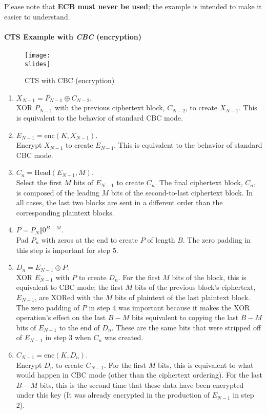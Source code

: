 Please note that \textbf{ECB must never be used}; the example is intended to make it easier to understand.

\paragraph{CTS Example with \textit{CBC} (encryption)}
\begin{figure}[H]
    \centering
    \texttt{[image: \\slides]}
    \caption{CTS with CBC (encryption)}
\end{figure}
\begin{enumerate}
    \item $X_{N-1} = P_{N-1} \oplus C_{N-2}$. \\
          XOR $P_{N-1}$ with the previous ciphertext block, $C_{N-2}$, to create $X_{N-1}$. This is equivalent to the behavior of standard CBC mode.
    \item $E_{N-1} = \text{enc}(K, X_{N-1})$.\\
          Encrypt $X_{N-1}$ to create $E_{N-1}$. This is equivalent to the behavior of standard CBC mode.
    \item $C_n = \text{Head}(E_{N-1}, M)$.\\
          Select the first $M$ bits of $E_{N-1}$ to create $C_n$. The final ciphertext block, $C_n$, is composed of the leading $M$ bits of the second-to-last ciphertext block. In all cases, the last two blocks are sent in a different order than the corresponding plaintext blocks.
    \item $P = P_{N} \Vert 0^{B-M}$.\\
          Pad $P_n$ with zeros at the end to create $P$ of length $B$. The zero padding in this step is important for step 5.
    \item $D_n = E_{N-1} \oplus P$.\\
          XOR $E_{N-1}$ with $P$ to create $D_n$. For the first $M$ bits of the block, this is equivalent to CBC mode; the first $M$ bits of the previous block's ciphertext, $E_{N-1}$, are XORed with the $M$ bits of plaintext of the last plaintext block. The zero padding of $P$ in step 4 was important because it makes the XOR operation's effect on the last $B-M$ bits equivalent to copying the last $B-M$ bits of $E_{N-1}$ to the end of $D_n$. These are the same bits that were stripped off of $E_{N-1}$ in step 3 when $C_n$ was created.
    \item $C_{N-1} = \text{enc}(K, D_n)$.\\
          Encrypt $D_n$ to create $C_{N-1}$. For the first $M$ bits, this is equivalent to what would happen in CBC mode (other than the ciphertext ordering). For the last $B-M$ bits, this is the second time that these data have been encrypted under this key (It was already encrypted in the production of $E_{N-1}$ in step 2).
\end{enumerate}



